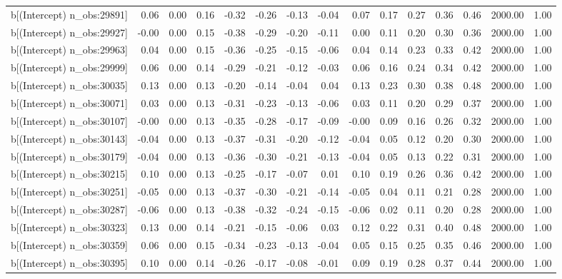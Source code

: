 \begin{table}[ht]
\begin{tabular}{rrrrrrrrrrrrrrr}
  b[(Intercept) n\_obs:29891] & 0.06 & 0.00 & 0.16 & -0.32 & -0.26 & -0.13 & -0.04 & 0.07 & 0.17 & 0.27 & 0.36 & 0.46 & 2000.00 & 1.00 \\ 
  b[(Intercept) n\_obs:29927] & -0.00 & 0.00 & 0.15 & -0.38 & -0.29 & -0.20 & -0.11 & 0.00 & 0.11 & 0.20 & 0.30 & 0.36 & 2000.00 & 1.00 \\ 
  b[(Intercept) n\_obs:29963] & 0.04 & 0.00 & 0.15 & -0.36 & -0.25 & -0.15 & -0.06 & 0.04 & 0.14 & 0.23 & 0.33 & 0.42 & 2000.00 & 1.00 \\ 
  b[(Intercept) n\_obs:29999] & 0.06 & 0.00 & 0.14 & -0.29 & -0.21 & -0.12 & -0.03 & 0.06 & 0.16 & 0.24 & 0.34 & 0.42 & 2000.00 & 1.00 \\ 
  b[(Intercept) n\_obs:30035] & 0.13 & 0.00 & 0.13 & -0.20 & -0.14 & -0.04 & 0.04 & 0.13 & 0.23 & 0.30 & 0.38 & 0.48 & 2000.00 & 1.00 \\ 
  b[(Intercept) n\_obs:30071] & 0.03 & 0.00 & 0.13 & -0.31 & -0.23 & -0.13 & -0.06 & 0.03 & 0.11 & 0.20 & 0.29 & 0.37 & 2000.00 & 1.00 \\ 
  b[(Intercept) n\_obs:30107] & -0.00 & 0.00 & 0.13 & -0.35 & -0.28 & -0.17 & -0.09 & -0.00 & 0.09 & 0.16 & 0.26 & 0.32 & 2000.00 & 1.00 \\ 
  b[(Intercept) n\_obs:30143] & -0.04 & 0.00 & 0.13 & -0.37 & -0.31 & -0.20 & -0.12 & -0.04 & 0.05 & 0.12 & 0.20 & 0.30 & 2000.00 & 1.00 \\ 
  b[(Intercept) n\_obs:30179] & -0.04 & 0.00 & 0.13 & -0.36 & -0.30 & -0.21 & -0.13 & -0.04 & 0.05 & 0.13 & 0.22 & 0.31 & 2000.00 & 1.00 \\ 
  b[(Intercept) n\_obs:30215] & 0.10 & 0.00 & 0.13 & -0.25 & -0.17 & -0.07 & 0.01 & 0.10 & 0.19 & 0.26 & 0.36 & 0.42 & 2000.00 & 1.00 \\ 
  b[(Intercept) n\_obs:30251] & -0.05 & 0.00 & 0.13 & -0.37 & -0.30 & -0.21 & -0.14 & -0.05 & 0.04 & 0.11 & 0.21 & 0.28 & 2000.00 & 1.00 \\ 
  b[(Intercept) n\_obs:30287] & -0.06 & 0.00 & 0.13 & -0.38 & -0.32 & -0.24 & -0.15 & -0.06 & 0.02 & 0.11 & 0.20 & 0.28 & 2000.00 & 1.00 \\ 
  b[(Intercept) n\_obs:30323] & 0.13 & 0.00 & 0.14 & -0.21 & -0.15 & -0.06 & 0.03 & 0.12 & 0.22 & 0.31 & 0.40 & 0.48 & 2000.00 & 1.00 \\ 
  b[(Intercept) n\_obs:30359] & 0.06 & 0.00 & 0.15 & -0.34 & -0.23 & -0.13 & -0.04 & 0.05 & 0.15 & 0.25 & 0.35 & 0.46 & 2000.00 & 1.00 \\ 
  b[(Intercept) n\_obs:30395] & 0.10 & 0.00 & 0.14 & -0.26 & -0.17 & -0.08 & -0.01 & 0.09 & 0.19 & 0.28 & 0.37 & 0.44 & 2000.00 & 1.00 \\ 

\end{tabular}
\end{table}
